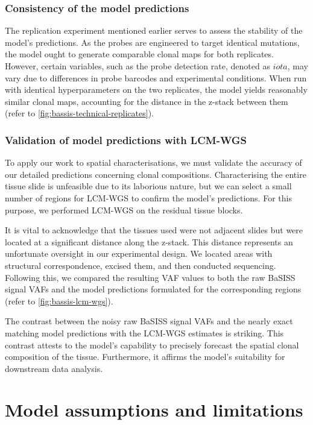 \subsubsection*{Consistency of the model predictions}
The replication experiment mentioned earlier serves to assess the stability of the model's predictions. As the probes are engineered to target identical mutations, the model ought to generate comparable clonal maps for both replicates. However, certain variables, such as the probe detection rate, denoted as $iota$, may vary due to differences in probe barcodes and experimental conditions. When run with identical hyperparameters on the two replicates, the model yields reasonably similar clonal maps, accounting for the distance in the z-stack between them (refer to \cref{fig:bassis-technical-replicates}).

\subsubsection*{Validation of model predictions with \ac{LCM}-\ac{WGS}}
To apply our work to spatial characterisations, we must validate the accuracy of our detailed predictions concerning clonal compositions. Characterising the entire tissue slide is unfeasible due to its laborious nature, but we can select a small number of regions for \ac{LCM}-\ac{WGS} to confirm the model's predictions. For this purpose, we performed \ac{LCM}-\ac{WGS} on the residual tissue blocks.

It is vital to acknowledge that the tissues used were not adjacent slides but were located at a significant distance along the z-stack. This distance represents an unfortunate oversight in our experimental design. We located areas with structural correspondence, excised them, and then conducted sequencing. Following this, we compared the resulting \ac{VAF} values to both the raw \ac{BaSISS} signal \ac{VAF}s and the model predictions formulated for the corresponding regions (refer to \cref{fig:bassis-lcm-wgs}).

The contrast between the noisy raw \ac{BaSISS} signal VAFs and the nearly exact matching model predictions with the \ac{LCM}-\ac{WGS} estimates is striking. This contrast attests to the model's capability to precisely forecast the spatial clonal composition of the tissue. Furthermore, it affirms the model's suitability for downstream data analysis.

\section{Model assumptions and limitations}

